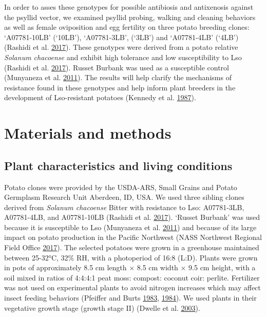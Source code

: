 \documentclass[]{article}
\begin{document}
In order to asses these genotypes for possible antibiosis and
antixenosis against the psyllid vector, we examined psyllid probing,
walking and cleaning behaviors as well as female oviposition and egg
fertility on three potato breeding clones: `A07781-10LB' (`10LB'),
`A07781-3LB', (`3LB') and `A07781-4LB' (`4LB') (Rashidi et al.
\protect\hyperlink{ref-Rashidi2017}{2017}). These genotypes were derived
from a potato relative \emph{Solanum chacoense} and exhibit high
tolerance and low susceptibility to Lso (Rashidi et al.
\protect\hyperlink{ref-Rashidi2017}{2017}). Russet Burbank was used as a
susceptible control (Munyaneza et al.
\protect\hyperlink{ref-Munyaneza2011}{2011}). The results will help
clarify the mechanisms of resistance found in these genotypes and help
inform plant breeders in the development of Lso-resistant potatoes
(Kennedy et al. \protect\hyperlink{ref-Kennedy1987}{1987}).\\

\hypertarget{ch:mms}{%
\section{Materials and methods}\label{ch:mms}}

\hypertarget{sec:plants}{%
\subsection{Plant characteristics and living
conditions}\label{sec:plants}}

Potato clones were provided by the USDA-ARS, Small Grains and Potato
Germplasm Research Unit Aberdeen, ID, USA. We used three sibling clones
derived from \emph{Solanum chacoense} Bitter with resistance to Lso:
A07781-3LB, A07781-4LB, and A07781-10LB (Rashidi et al.
\protect\hyperlink{ref-Rashidi2017}{2017}). `Russet Burbank' was used
because it is susceptible to Lso (Munyaneza et al.
\protect\hyperlink{ref-Munyaneza2011}{2011}) and because of its large
impact on potato production in the Pacific Northwest (NASS Northwest
Regional Field Office
\protect\hyperlink{ref-NASSNorthwestRegionalFieldOffice2017}{2017}). The
selected potatoes were grown in a greenhouse maintained between 25-32°C,
32\% RH, with a photoperiod of 16:8 (L:D). Plants were grown in pots of
approximately 8.5 cm length \(\times\) 8.5 cm width \(\times\) 9.5 cm
height, with a soil mixed in ratios of 4:4:4:1 peat moss: compost:
coconut coir: perlite. Fertilizer was not used on experimental plants to
avoid nitrogen increases which may affect insect feeding behaviors
(Pfeiffer and Burts \protect\hyperlink{ref-Pfeiffer1983}{1983},
\protect\hyperlink{ref-Pfeiffer1984}{1984}). We used plants in their
vegetative growth stage (growth stage II) (Dwelle et al.
\protect\hyperlink{ref-Dwelle2003}{2003}).
\end{document}
